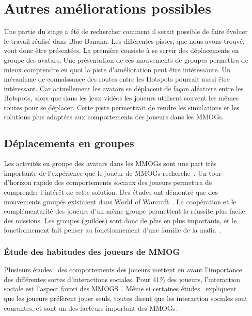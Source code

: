 \newpage
\section{Autres améliorations possibles}

Une partie du stage a été de rechercher comment il serait possible de faire évoluer le travail réalisé dans Blue Banana. Les différentes pistes, que nous avons trouvé, vont donc être présentées. La première consiste à se servir des déplacements en groupe des avatars. Une présentation de ces mouvements de groupes permettra de mieux comprendre en quoi la piste d'amélioration peut être intéressante. Un mécanisme de connaissance des routes entre les Hotspots pourrait aussi être intéressant. Car actuellement les avatars se déplacent de façon aléatoire entre les Hotspots, alors que  dans les jeux vidéos les joueurs utilisent souvent les mêmes routes pour se déplacer. Cette piste permettrait de rendre les simulations et les solutions plus adaptées aux comportements des joueurs dans les MMOGs.

\subsection{Déplacements en groupes}

Les activités en groupe des avatars dans les MMOGs sont une part très importante de l'expérience que le joueur de MMOGs recherche~\cite{1501834,1255052}. Un tour d'horizon rapide des comportements sociaux des joueurs permettra de comprendre l'intérêt de cette solution. Des études ont démontré que des mouvements groupés existaient dans World of Warcraft~\cite{15141312}. La coopération et le complémentarité des joueurs d'un même groupe permettent la réussite plus facile des missions. Les groupes (guildes) sont donc de plus en plus importants, et le fonctionnement fait penser au fonctionnement d'une famille de la mafia~\cite{Jakobsson03thesopranos}.


\subsubsection{Étude des habitudes des joueurs de MMOG}

Plusieurs études~\cite{BreakingSteretype,1159988,1255052,StudyEQ} des comportements des joueurs mettent en avant l'importance des différentes sortes d'interactions sociales. Pour 41\% des joueurs, l'interaction sociale est l'aspect favori des MMOGS~\cite{BreakingSteretype}. Même si certaines études~\cite{1124834,1031667} expliquent que les joueurs préfèrent jouer seuls, toutes disent que les interaction sociales sont courantes, et sont un des facteurs important des MMOGs. 

